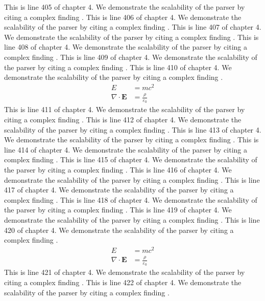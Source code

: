 This is line 405 of chapter 4. We demonstrate the scalability of the parser by citing a complex finding \cite{ref4_405}.
This is line 406 of chapter 4. We demonstrate the scalability of the parser by citing a complex finding \cite{ref4_406}.
This is line 407 of chapter 4. We demonstrate the scalability of the parser by citing a complex finding \cite{ref4_407}.
This is line 408 of chapter 4. We demonstrate the scalability of the parser by citing a complex finding \cite{ref4_408}.
This is line 409 of chapter 4. We demonstrate the scalability of the parser by citing a complex finding \cite{ref4_409}.
This is line 410 of chapter 4. We demonstrate the scalability of the parser by citing a complex finding \cite{ref4_410}.
\begin{align*}
  E &= mc^2 \\
  \nabla \cdot \mathbf{E} &= \frac{\rho}{\varepsilon_0}
\end{align*}
This is line 411 of chapter 4. We demonstrate the scalability of the parser by citing a complex finding \cite{ref4_411}.
This is line 412 of chapter 4. We demonstrate the scalability of the parser by citing a complex finding \cite{ref4_412}.
This is line 413 of chapter 4. We demonstrate the scalability of the parser by citing a complex finding \cite{ref4_413}.
This is line 414 of chapter 4. We demonstrate the scalability of the parser by citing a complex finding \cite{ref4_414}.
This is line 415 of chapter 4. We demonstrate the scalability of the parser by citing a complex finding \cite{ref4_415}.
This is line 416 of chapter 4. We demonstrate the scalability of the parser by citing a complex finding \cite{ref4_416}.
This is line 417 of chapter 4. We demonstrate the scalability of the parser by citing a complex finding \cite{ref4_417}.
This is line 418 of chapter 4. We demonstrate the scalability of the parser by citing a complex finding \cite{ref4_418}.
This is line 419 of chapter 4. We demonstrate the scalability of the parser by citing a complex finding \cite{ref4_419}.
This is line 420 of chapter 4. We demonstrate the scalability of the parser by citing a complex finding \cite{ref4_420}.
\begin{align*}
  E &= mc^2 \\
  \nabla \cdot \mathbf{E} &= \frac{\rho}{\varepsilon_0}
\end{align*}
This is line 421 of chapter 4. We demonstrate the scalability of the parser by citing a complex finding \cite{ref4_421}.
This is line 422 of chapter 4. We demonstrate the scalability of the parser by citing a complex finding \cite{ref4_422}.
